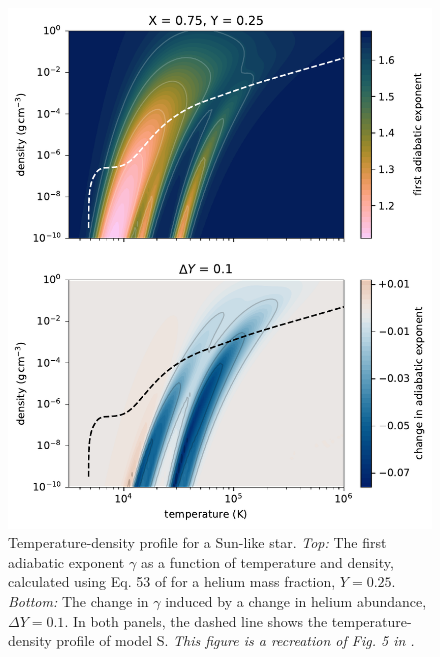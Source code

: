 \begin{figure}
    \centering
    \includegraphics{figures/adiabatic-ionisation-temp.pdf}
    \caption[Temperature-density profile for a Sun-like star.]{Temperature-density profile for a Sun-like star. \emph{Top:} The first adiabatic exponent \(\gamma\) as a function of temperature and density, calculated using Eq. 53 of \citet{Houdayer.Reese.ea2021} for a helium mass fraction, \(Y=0.25\). \emph{Bottom:} The change in \(\gamma\) induced by a change in helium abundance, \(\Delta Y = 0.1\). In both panels, the dashed line shows the temperature-density profile of model S. \emph{This figure is a recreation of Fig. 5 in \citet{Houdayer.Reese.ea2021}.}}
    \label{fig:gamma-temp-density}
\end{figure}

